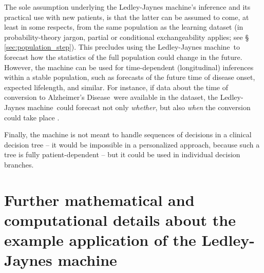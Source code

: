 \documentclass[utf8]{FrontiersinHarvard_mod} %
\newcommand*{\sect}{\S}%
\newcommand*{\chap}{ch.}%
\newcommand*{\eg}{{e.g.}}
\newcommand*{\cf}{{cf.}}
\renewcommand*{\|}[1][]{\nonscript\:#1\vert\nonscript\:\mathopen{}}
\newcommand*{\ad}{Alzheimer's Disease}
\newcommand*{\ljm}{Ledley-Jaynes machine}
\begin{document}
The sole assumption underlying the \ljm's inference and its practical use with new patients, is that the latter can be assumed to come, at least in some respects, from the same population as the learning dataset (in probability-theory jargon, partial or conditional exchangeability applies; see \sect\,\ref{sec:population_step}). This precludes using the \ljm\ to forecast how the statistics of the full population could change in the future. However, the machine can be used for time-dependent (longitudinal) inferences within a stable population, such as forecasts of the future time of disease onset, expected lifelength, and similar. For instance, if data about the time of conversion to \ad\ were available in the dataset, the \ljm\ could forecast not only \emph{whether}, but also \emph{when} the conversion could take place \citep[\cf\ \eg][]{delacruzmesiaetal2007}.

Finally, the machine is not meant to handle sequences of decisions in a clinical decision tree \citetext{\citealp[\chap~6]{soxetal1988_r2013}; \citealp[\chap~1]{huninketal2001_r2014}} -- it would be impossible in a personalized approach, because such a tree is fully patient-dependent -- but it could be used in individual decision branches.


\bigskip%
\appendix
\renewcommand\thesection{\Alph{section}}
\section{Further mathematical and computational details about the example application of the \ljm}
\label{sec:appendices}
\end{document}
